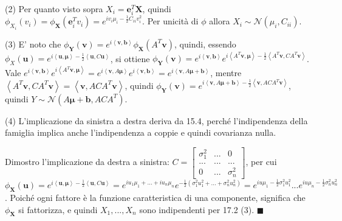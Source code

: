 \documentclass{article}
\begin{document}
(2) Per quanto visto sopra $X_{i}=\mathbf{e}_{i}^{T}\mathbf{X}$, quindi $%
\phi _{X_{i}}\left( v_{i}\right) =\phi _{\mathbf{X}}\left( \mathbf{e}%
_{i}^{T}v_{i}\right) =e^{iv_{i}\mu _{i}-\frac{1}{2}C_{ii}v_{i}^{2}}$. Per
unicit\`{a} di $\phi $ allora $X_{i}\sim \mathcal{N}\left( \mu
_{i},C_{ii}\right) $.

(3) E' noto che $\phi _{\mathbf{Y}}\left( \mathbf{v}\right)
=e^{i\left\langle \mathbf{v,b}\right\rangle }\phi _{\mathbf{X}}\left( A^{T}%
\mathbf{v}\right) $, quindi, essendo $\phi _{X}\left( \mathbf{u}\right)
=e^{i\left\langle \mathbf{u,\mu }\right\rangle -\frac{1}{2}\left\langle 
\mathbf{u},C\mathbf{u}\right\rangle }$, si ottiene $\phi _{\mathbf{Y}}\left( 
\mathbf{v}\right) =e^{i\left\langle \mathbf{v,b}\right\rangle
}e^{i\left\langle A^{T}\mathbf{v,\mu }\right\rangle -\frac{1}{2}\left\langle
A^{T}\mathbf{v},CA^{T}\mathbf{v}\right\rangle }$. Vale $e^{i\left\langle 
\mathbf{v,b}\right\rangle }e^{i\left\langle A^{T}\mathbf{v,\mu }%
\right\rangle }=e^{i\left\langle \mathbf{v},A\mathbf{\mu }\right\rangle
}e^{i\left\langle \mathbf{v,b}\right\rangle }=e^{i\left\langle \mathbf{v},A%
\mathbf{\mu +b}\right\rangle }$, mentre $\left\langle A^{T}\mathbf{v},CA^{T}%
\mathbf{v}\right\rangle =\left\langle \mathbf{v},ACA^{T}\mathbf{v}%
\right\rangle $, quindi $\phi _{\mathbf{Y}}\left( \mathbf{v}\right)
=e^{i\left\langle \mathbf{v},A\mathbf{\mu +b}\right\rangle -\frac{1}{2}%
\left\langle \mathbf{v},ACA^{T}\mathbf{v}\right\rangle }$, quindi $Y\sim 
\mathcal{N}\left( A\mathbf{\mu +b},ACA^{T}\right) $.

(4) L'implicazione da sinistra a destra deriva da 15.4, perch\'{e}
l'indipendenza della famiglia implica anche l'indipendenza a coppie e quindi
covarianza nulla.

Dimostro l'implicazione da destra a sinistra: $C=\left[ 
\begin{array}{ccc}
\sigma _{1}^{2} & ... & 0 \\ 
... & ... & ... \\ 
0 & ... & \sigma _{n}^{2}%
\end{array}%
\right] $, per cui $\phi _{\mathbf{X}}\left( \mathbf{u}\right)
=e^{i\left\langle \mathbf{u,\mu }\right\rangle -\frac{1}{2}\left\langle 
\mathbf{u},C\mathbf{u}\right\rangle }=e^{iu_{1}\mu _{1}+...+iu_{n}\mu
_{n}}e^{-\frac{1}{2}\left( \sigma _{1}^{2}u_{1}^{2}+...+\sigma
_{n}^{2}u_{n}^{2}\right) }=e^{iu\mu _{1}-\frac{1}{2}\sigma
_{1}^{2}u_{1}^{2}}...e^{iu\mu _{n}-\frac{1}{2}\sigma _{n}^{2}u_{n}^{2}}$.
Poich\'{e} ogni fattore \`{e} la funzione caratteristica di una componente,
significa che $\phi _{\mathbf{X}}$ si fattorizza, e quindi $X_{1},...,X_{n}$
sono indipendenti per 17.2 (3). $\blacksquare $
\end{document}
